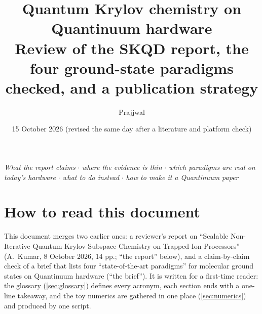 \documentclass[11pt,a4paper]{article}
\title{Quantum Krylov chemistry on Quantinuum hardware\\\large Review of the SKQD report, the four ground-state paradigms checked, and a publication strategy}
\author{Prajjwal}
\date{15 October 2026 (revised the same day after a literature and platform check)}
\newcommand{\report}{the report}
\begin{document}
\maketitle

\begin{center}\small
\emph{What the report claims} $\cdot$ \emph{where the evidence is thin} $\cdot$ \emph{which paradigms are real on today's hardware} $\cdot$ \emph{what to do instead} $\cdot$ \emph{how to make it a Quantinuum paper}
\end{center}

\section*{How to read this document}
This document merges two earlier ones: a reviewer's report on ``Scalable Non-Iterative Quantum Krylov Subspace Chemistry on Trapped-Ion Processors'' (A.~Kumar, 8 October 2026, 14 pp.; ``\report'' below), and a claim-by-claim check of a brief that lists four ``state-of-the-art paradigms'' for molecular ground states on Quantinuum hardware (``the brief''). It is written for a first-time reader: the glossary (\cref{sec:glossary}) defines every acronym, each section ends with a one-line takeaway, and the toy numerics are gathered in one place (\cref{sec:numerics}) and produced by one script.
\end{document}
